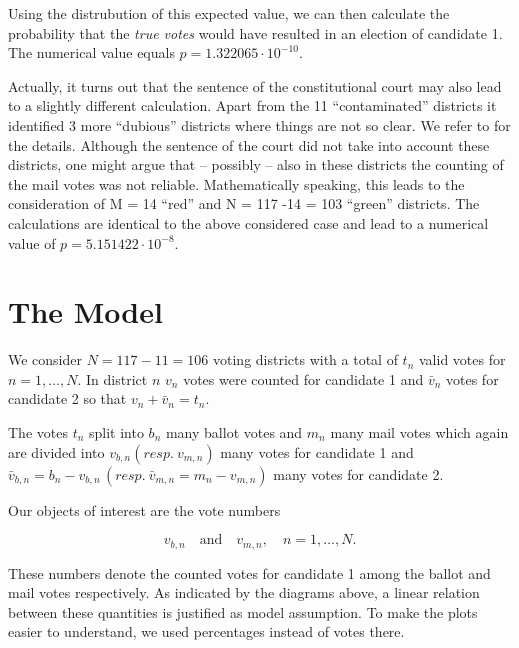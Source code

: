 \documentclass[12pt,a4paper]{article}
\theoremstyle{definition}
\begin{document}
Using the distrubution of this expected value, we can then  calculate the probability that the {\it true votes} would have resulted in an election of candidate 1.
The numerical value equals $p = 1.322065 \cdot 10^{-10}$.

Actually, it turns out that the sentence of the constitutional court may also lead to a slightly different calculation. Apart from the 11 ``contaminated'' districts it identified 3 more ``dubious'' districts where things are not so clear. We refer to \cite{vfgh} for the details. Although the sentence of the court did not take into account these districts, one might argue that -- possibly -- also in these districts the counting of the mail votes was not reliable.  Mathematically speaking, this leads to the consideration of M = 14 ``red'' and N = 117 -14 = 103 ``green'' districts. The calculations are identical to the above considered case and lead to a numerical value of $p = 5.151422 \cdot 10^{-8}$.



\section{The Model}

We consider $N=117-11=106$ voting districts with a total of $t_n$ valid votes for $n=1, \dots,N.$ In district $n$ $v_n$ votes were counted for candidate 1 and $\bar{v}_n$ votes for candidate 2 so that
$v_n + \bar{v}_n = t_n$. 

The votes $t_n$ split into $b_n$ many ballot votes and $m_n$ many mail votes which again are divided into $v_{b,n} (resp.~v_{m,n})$ many votes for candidate 1 and $\bar{v}_{b,n}=b_n-v_{b,n} \,(resp.~ \bar{v}_{m,n} = m_n - v_{m,n})$ many votes for candidate 2.

Our objects of interest are the vote numbers


$$v_{b,n} \quad \mbox{and} \quad v_{m,n} , \quad n=1, \dots, N.$$



These numbers denote the counted votes for candidate 1 among the ballot and mail votes respectively. As indicated by the diagrams above, a linear relation between these quantities is justified as model assumption. To make the plots easier to understand, we used percentages instead of votes there.
\end{document}
